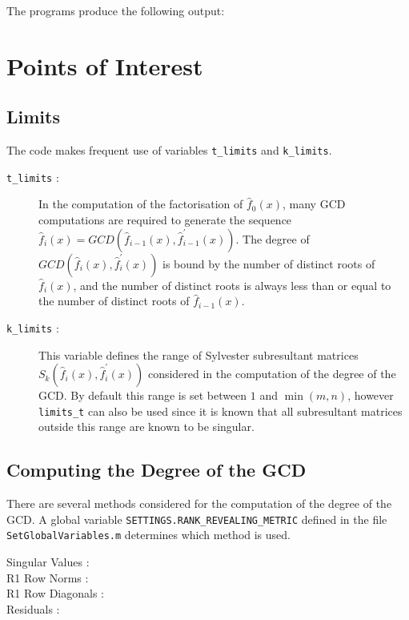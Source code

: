 \documentclass[a4paper,11pt]{article}
\begin{document}
The programs produce the following output:
%
\section{Points of Interest}
\subsection{Limits}
The code makes frequent use of variables \texttt{t\_limits} and \texttt{k\_limits}. 
\begin{description}

	\item[\texttt{t\_limits} : ] In the computation of the factorisation of $\hat{f}_{0}(x)$, many \gls{GCD} computations are required to generate the sequence 
	$
		\hat{f}_{i}(x)
		=
		GCD
		\left(
			\hat{f}_{i-1}(x)
			,
			\hat{f}_{i-1}^{'}(x)
		\right)
	$. The degree of
	$
		GCD
		\left(
			\hat{f}_{i}(x)
			,
			\hat{f}_{i}^{'}(x)
		\right)
	$ is bound by the number of distinct roots of $\hat{f}_{i}(x)$, and the number of distinct roots is always less than or equal to the number of distinct roots of $\hat{f}_{i-1}(x)$. 
	
	\item[\texttt{k\_limits} : ] This variable defines the range of Sylvester subresultant matrices 
	$
		S_{k}
		\left(
			\hat{f}_{i}(x)
			,
			\hat{f}_{i}^{'}(x)
		\right)
	$ considered in the computation of the degree of the \gls{GCD}. By default this range is set between $1$ and $\min(m,n)$, however \texttt{limits\_t} can also be used since it is known that all subresultant matrices outside this range are known to be singular. 
\end{description}

\subsection{Computing the Degree of the GCD}
There are several methods considered for the computation of the degree of the \gls{GCD}. A global variable \texttt{SETTINGS.RANK\_REVEALING\_METRIC} defined in the file \texttt{SetGlobalVariables.m} determines which method is used.

\begin{description}
	
	\item[Singular Values : ] 
	
	\item[R1 Row Norms :]
	
	\item[R1 Row Diagonals : ]
	
	\item[Residuals : ]
	
\end{description}

%
\end{document}
